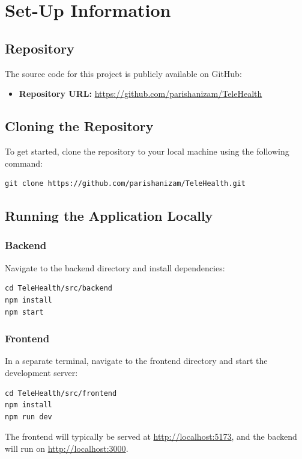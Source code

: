 \documentclass{article}
\begin{document}
\section{Set-Up Information}

\subsection{Repository}
The source code for this project is publicly available on GitHub:
\begin{itemize}
    \item \textbf{Repository URL:} \url{https://github.com/parishanizam/TeleHealth}
\end{itemize}

\subsection{Cloning the Repository}
To get started, clone the repository to your local machine using the following command:

\begin{verbatim}
git clone https://github.com/parishanizam/TeleHealth.git
\end{verbatim}

\subsection{Running the Application Locally}

\subsubsection{Backend}
Navigate to the backend directory and install dependencies:

\begin{verbatim}
cd TeleHealth/src/backend
npm install
npm start
\end{verbatim}

\subsubsection{Frontend}
In a separate terminal, navigate to the frontend directory and start the development server:

\begin{verbatim}
cd TeleHealth/src/frontend
npm install
npm run dev
\end{verbatim}

The frontend will typically be served at \url{http://localhost:5173}, and the backend will run on \url{http://localhost:3000}.
\end{document}
